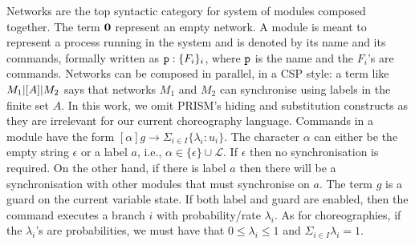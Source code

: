 Networks are the top syntactic category for system of modules composed
together. The term $\mathbf{0}$ represent an empty network. A module is
meant to represent a process running in the system and is denoted by
its name and its commands, formally written as $\mathtt{p}:\{F_i\}_i$,
where $\mathtt{p}$ is the name and the $F_i$'s are commands. Networks can
be composed in parallel, in a CSP style: a term like $M_1 |[A]| M_2$
says that networks $M_1$ and $M_2$ can synchronise using labels in the
finite set $A$.
%
In this work, we omit PRISM's hiding and substitution constructs as
they are irrelevant for our current choreography language.
%
Commands in a module have the form
$[\alpha] g \rightarrow \Sigma_{i\in I}\{\lambda_i: u_i\}$. The
character $\alpha$ can either be the empty string $\epsilon$ or a
label $a$, i.e., $\alpha\in\{\epsilon\}\cup \mathcal L$. If $\epsilon$
then no synchronisation is required. On the other hand, if there is
label $a$ then there will be a synchronisation with other modules that
must synchronise on $a$. The term $g$ is a guard on the current
variable state. If both label and guard are enabled, then the command
executes a branch $i$ with probability/rate $\lambda_i$. As for
choreographies, if the $\lambda_i$'s are probabilities, we must have
that $0\leq\lambda_i\leq 1$ and $\Sigma_{i\in I}\lambda_i=1$.

